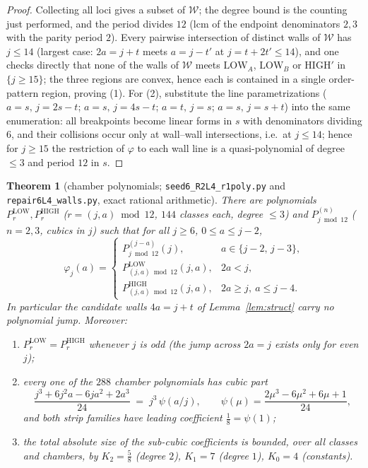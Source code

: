 \documentclass[11pt]{article}
\newtheorem{theorem}{Theorem}[section]
\theoremstyle{definition}
\theoremstyle{remark}
\begin{document}
\begin{proof}
Collecting all loci gives a subset of $\mathcal{W}$; the degree bound is
the counting just performed, and the period divides $12$
($\mathrm{lcm}$ of the endpoint denominators $2,3$ with the parity
period $2$). Every pairwise intersection of distinct walls of
$\mathcal{W}$ has $j\le14$ (largest case: $2a=j+t$ meets $a=j-t'$ at
$j=t+2t'\le14$), and one checks directly that none of the walls of
$\mathcal{W}$ meets $\mathrm{LOW}_A$, $\mathrm{LOW}_B$ or $\mathrm{HIGH}'$
in $\{j\ge15\}$; the three regions are convex, hence each is contained in
a single order-pattern region, proving (1). For (2), substitute the line
parametrizations ($a=s,\,j=2s-t$; $a=s,\,j=4s-t$; $a=t,\,j=s$;
$a=s,\,j=s+t$) into the same enumeration: all breakpoints become linear
forms in $s$ with denominators dividing $6$, and their collisions occur
only at wall--wall intersections, i.e.\ at $j\le14$; hence for $j\ge15$
the restriction of $\varphi$ to each wall line is a quasi-polynomial of
degree $\le3$ and period $12$ in $s$.
\end{proof}

\begin{theorem}[chamber polynomials; \texttt{seed6\_R2L4\_r1poly.py} and
\texttt{repair6L4\_walls.py}, exact rational arithmetic]\label{thm:chamber}
There are polynomials $P^{\mathrm{LOW}}_{r},P^{\mathrm{HIGH}}_{r}$
($r=(j,a)\bmod 12$, $144$ classes each, degree $\le3$) and
$P^{(n)}_{j\bmod 12}$ ($n=2,3$, cubics in $j$) such that for all $j\ge6$,
$0\le a\le j-2$,
\[
\varphi_j(a)=
\begin{cases}
P^{(j-a)}_{j\bmod12}(j), & a\in\{j-2,\,j-3\},\\[2pt]
P^{\mathrm{LOW}}_{(j,a)\bmod12}(j,a), & 2a<j,\\[2pt]
P^{\mathrm{HIGH}}_{(j,a)\bmod12}(j,a), & 2a\ge j,\ a\le j-4.
\end{cases}
\]
In particular the candidate walls $4a=j+t$ of Lemma~\ref{lem:struct} carry
no polynomial jump. Moreover:
\begin{enumerate}
\item $P^{\mathrm{LOW}}_r=P^{\mathrm{HIGH}}_r$ whenever $j$ is odd (the
jump across $2a=j$ exists only for even $j$);
\item \emph{every} one of the $288$ chamber polynomials has cubic part
\[
\frac{j^3+6j^2a-6ja^2+2a^3}{24}\;=\;j^3\,\psi(a/j),
\qquad \psi(\mu)=\frac{2\mu^3-6\mu^2+6\mu+1}{24},
\]
and both strip families have leading coefficient $\tfrac18=\psi(1)$;
\item the total absolute size of the sub-cubic coefficients is bounded, over
all classes and chambers, by $K_2=\tfrac58$ (degree $2$), $K_1=7$ (degree
$1$), $K_0=4$ (constants).
\end{enumerate}
\end{theorem}
\end{document}
